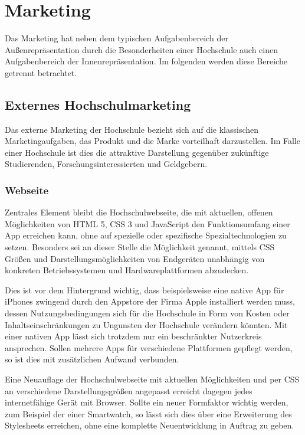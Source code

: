 \section{Marketing}
\label{section_marketing}
Das Marketing hat neben dem typischen Aufgabenbereich der Außenrepräsentation durch die Besonderheiten einer Hochschule auch einen Aufgabenbereich der Innenrepräsentation. Im folgenden werden diese Bereiche getrennt betrachtet.

\subsection{Externes Hochschulmarketing}
\label{subsection_externes_hochschulemarketing}
Das externe Marketing der Hochschule bezieht sich auf die klassischen Marketingaufgaben, das Produkt und die Marke vorteilhaft darzustellen. Im Falle einer Hochschule ist dies die attraktive Darstellung gegenüber zukünftige Studierenden, Forschungsinteressierten und Geldgebern.

\subsubsection{Webseite}
Zentrales Element bleibt die Hochschulwebseite, die mit aktuellen, offenen Möglichkeiten von HTML 5, CSS 3 und JavaScript den Funktionsumfang einer App erreichen kann, ohne auf spezielle oder spezifische Spezialtechnologien zu setzen. Besonders sei an dieser Stelle die Möglichkeit genannt, mittels CSS Größen und Darstellungsmöglichkeiten von Endgeräten unabhängig von konkreten Betriebssystemen und Hardwareplattformen abzudecken.

Dies ist vor dem Hintergrund wichtig, dass beispielsweise eine native App für iPhones zwingend durch den Appstore der Firma Apple installiert werden muss, dessen Nutzungsbedingungen sich für die Hochschule in Form von Kosten oder Inhaltseinschränkungen zu Ungunsten der Hochschule verändern könnten. Mit einer nativen App lässt sich trotzdem nur ein beschränkter Nutzerkreis ansprechen. Sollen mehrere Apps für verschiedene Plattformen gepflegt werden, so ist dies mit zusätzlichen Aufwand verbunden.

Eine Neuauflage der Hochschulwebseite mit aktuellen Möglichkeiten und per CSS an verschiedene Darstellungsgrößen angepasst erreicht dagegen jedes internetfähige Gerät mit Browser. Sollte ein neuer Formfaktor wichtig werden, zum Beispiel der einer Smartwatch, so lässt sich dies über eine Erweiterung des Stylesheets erreichen, ohne eine komplette Neuentwicklung in Auftrag zu geben.

